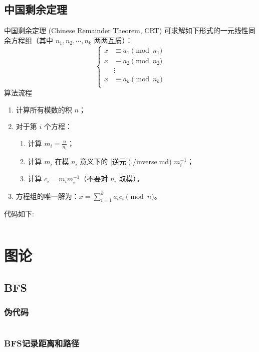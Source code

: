 \documentclass[a4paper,11pt]{article}
\begin{document}
\subsection{中国剩余定理}
中国剩余定理 (Chinese Remainder Theorem, CRT) 可求解如下形式的一元线性同余方程组（其中 $n_1, n_2, \cdots, n_k$ 两两互质）：
$$
\begin{cases}
x &\equiv a_1 \pmod {n_1} \\
x &\equiv a_2 \pmod {n_2} \\
  &\vdots \\
x &\equiv a_k \pmod {n_k} \\
\end{cases}
$$
算法流程
\begin{enumerate}
    \item 计算所有模数的积 $n$；
    \item 对于第 $i$ 个方程：
        \begin{enumerate}
            \item 计算 $m_i=\frac{n}{n_i}$；
            \item 计算 $m_i$ 在模 $n_i$ 意义下的 [逆元](./inverse.md)  $m_i^{-1}$；
            \item 计算 $c_i=m_im_i^{-1}$（不要对 $n_i$ 取模）。
        \end{enumerate}
    \item 方程组的唯一解为：$x=\sum_{i=1}^k a_ic_i \pmod n$。
\end{enumerate}
代码如下:
\inputminted[breaklines,linenos,frame=leftline]{c++}{math/crt.cpp}

\newpage
\section{图论} %

\subsection{BFS}
\subsubsection{伪代码}
\inputminted[breaklines,linenos,frame=leftline]{c++}{graph/bfs1.cpp}
\subsubsection{BFS记录距离和路径}
\inputminted[breaklines,linenos,frame=leftline]{c++}{graph/bfs2.cpp}
\end{document}
